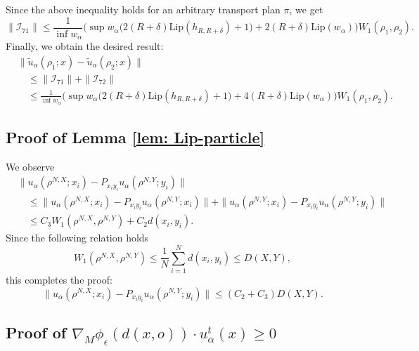 \documentclass[11pt]{amsart}
\newcommand{\p}{o}%
\newcommand{\dist}{d}%
\begin{document}
Since the above inequality holds for an arbitrary transport plan $\pi$, we get
\[
\|\mathcal{I}_{71}\|\leq\frac{1}{\inf w_\alpha}\bigg(\sup w_\alpha\big(2(R+\delta)\mathrm{Lip}(h_{R,R+\delta})+1\big)+2(R+\delta)\mathrm{Lip}(w_\alpha)\bigg) W_1(\rho_1, \rho_2).
\]
Finally, we obtain the desired result:
\begin{align*}
&\|\tilde{u}_\alpha(\rho_1;x)-\tilde{u}_\alpha(\rho_2;x)\|\\
&\quad \leq  \|\mathcal{I}_{71}\|+\|\mathcal{I}_{72}\|\\
&\quad \leq\frac{1}{\inf w_\alpha}\bigg(\sup w_\alpha\big(2(R+\delta)\mathrm{Lip}(h_{R,R+\delta})+1\big)+4(R+\delta)\mathrm{Lip}(w_\alpha)\bigg)W_1(\rho_1, \rho_2).
\end{align*}
 





\subsection{Proof of Lemma \ref{lem: Lip-particle}}\label{proof:lem: Lip-particle} We observe 
\begin{align*}
&\|u_\alpha(\rho^{N, X};x_i)-P_{x_iy_i}u_\alpha(\rho^{N, Y};y_i)\|\\
&\quad \leq\|u_\alpha(\rho^{N, X};x_i)-P_{x_iy_i}u_\alpha(\rho^{N, Y};x_i)\|+\|u_\alpha(\rho^{N, Y};x_i)-P_{x_iy_i}u_\alpha(\rho^{N, Y};y_i)\|\\
&\quad \leq C_3 W_1(\rho^{N,X}, \rho^{N, Y})+C_2\dist(x_i, y_i).
\end{align*}
Since the following relation holds
\[
W_1(\rho^{N,X},\rho^{N, Y})\leq \frac{1}{N}\sum_{i=1}^N\dist(x_i, y_i)\leq D(X, Y),
\]
this completes the proof:
\[
\|u_\alpha(\rho^{N, X};x_i)-P_{x_iy_i}u_\alpha(\rho^{N, Y};y_i)\|\leq (C_2+C_3)D(X, Y).
\]


\subsection{Proof of $\nabla_M\phi_\epsilon(\dist(x, \p))\cdot u_\alpha^t(x)\geq0$}\label{secA:8}
\end{document}
